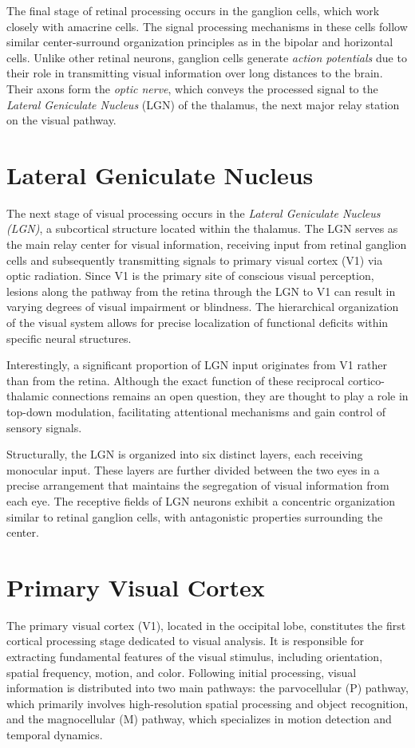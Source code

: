 The final stage of retinal processing occurs in the ganglion cells, 
which work closely with amacrine cells. The signal processing mechanisms
in these cells follow similar center-surround organization principles as in
the bipolar and horizontal cells. Unlike other retinal neurons, ganglion
cells generate \emph{action potentials} due to their role in transmitting
visual information over long distances to the brain. Their axons form the
\emph{optic nerve}, which conveys the processed signal to the
\emph{Lateral Geniculate Nucleus} (LGN) of the thalamus, the next major relay
station on the visual pathway.

\section{Lateral Geniculate Nucleus}
\label{sec:lgn}
The next stage of visual processing occurs in the \emph{Lateral Geniculate Nucleus (LGN)}, 
a subcortical structure located within the thalamus. The LGN serves as the main relay center
for visual information, receiving input from retinal ganglion cells and
subsequently transmitting signals to primary visual cortex (V1) via optic radiation. 
Since V1 is the primary site of conscious visual perception, lesions along the pathway from the
retina through the LGN to V1 can result in varying degrees of visual impairment or blindness. 
The hierarchical organization of the visual system allows for precise localization of functional
deficits within specific neural structures.

Interestingly, a significant proportion of LGN input originates from V1 rather than from the retina. 
Although the exact function of these reciprocal cortico-thalamic connections remains an open question, 
they are thought to play a role in top-down modulation, facilitating attentional mechanisms
and gain control of sensory signals.

Structurally, the LGN is organized into six distinct layers, each receiving monocular input. 
These layers are further divided between the two eyes in a precise arrangement that maintains
the segregation of visual information from each eye. The receptive fields of LGN neurons exhibit a
concentric organization similar to retinal ganglion cells, with antagonistic properties surrounding the center.

\section{Primary Visual Cortex}
\label{sec:v1}
The primary visual cortex (V1), located in the occipital lobe, constitutes the first
cortical processing stage dedicated to visual analysis. It is responsible for extracting
fundamental features of the visual stimulus, including orientation, spatial frequency, 
motion, and color. Following initial processing, visual information is distributed into two main pathways: the parvocellular (P) pathway, which primarily involves
high-resolution spatial processing and object recognition, and the magnocellular (M) pathway, 
which specializes in motion detection and temporal dynamics.

